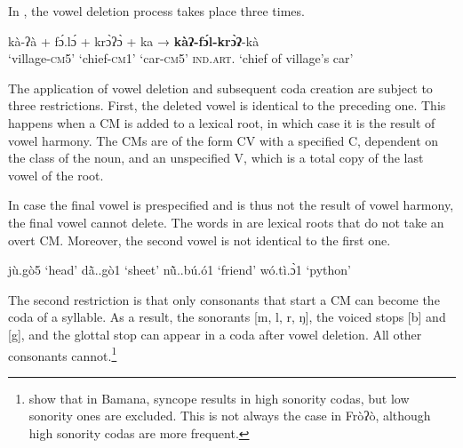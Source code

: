 \documentclass[output=paper]{langscibook}
\begin{document}
In , the vowel deletion process takes place three times.      

 \begin{exe}
    \ex \gll kà-ʔà             +     fɔ́.lɔ́                  + krɔ̀ʔɔ̀            +   ka                  →      \textbf{kàʔ-fɔ́l-krɔ̀ʔ}-kà \label{ex:traore:tripleVowelDeletion:21}\\
            `village-\textsc{cm}5'  {} `chief-\textsc{cm1}' {} `car-\textsc{cm}5'   {}  \textsc{ind.art}.   {}       {‘chief of village’s car’}\\
 \end{exe}
          
The application of vowel deletion and subsequent coda creation are subject to three restrictions. First, the deleted vowel is identical to the preceding one. This happens when a CM is added to a lexical root, in which case it is the result of vowel harmony. The CMs are of the form CV with a specified C, dependent on the class of the noun, and an unspecified V, which is a total copy of the last vowel of the root. 

In case the final vowel is prespecified and is thus not the result of vowel harmony, the final vowel cannot delete. %
The words in  are lexical roots that do not take an overt CM. Moreover, the second vowel is not identical to the first one.%
 
\noindent\parbox{\textwidth}{\begin{exe}\setlength{\multicolsep}{0pt}
    \ex\label{ex:traore:lexicalRootsWithoutCM:22}
    \begin{multicols}{4}\raggedcolumns
    \begin{xlist} 
    \ex  jù.gò5
      \trans  `head'
    \ex dã̀..gò1
       \trans `sheet'
    \ex nũ̀..bú.ó1
    \trans `friend'
    \ex wó.tì.ɔ̀1
      \trans `python'
  \end{xlist}\end{multicols}
 \end{exe}}

The second restriction is that only consonants that start a CM can become the coda of a syllable. As a result, the sonorants [m, l, r, ŋ], the voiced stops [b] and [g], and the glottal stop can appear in a coda after vowel deletion. All other consonants cannot.\footnote{\citet{Green2014} show that in Bamana, syncope results in high sonority codas, but low sonority ones are excluded. This is not always the case in Fròʔò, although high sonority codas are more frequent.}
\end{document}
